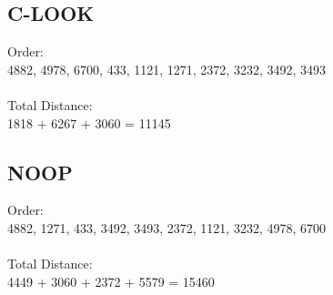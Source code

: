 \documentclass[a4paper, 11pt]{article}
\begin{document}
        \subsection{C-LOOK}
        Order: \\
        4882, 4978, 6700, 433, 1121, 1271, 2372, 3232, 3492, 3493 \\\\
        Total Distance: \\
        1818 + 6267 + 3060 = 11145
        \subsection{NOOP}
        Order: \\
        4882, 1271, 433, 3492, 3493, 2372, 1121, 3232, 4978, 6700 \\\\
        Total Distance: \\
        4449 + 3060 + 2372 + 5579 = 15460
\end{document}
